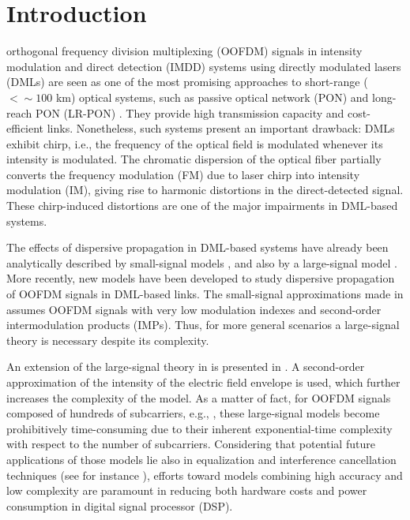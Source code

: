\documentclass[journal]{IEEEtran}
\begin{document}
\section{Introduction}
 orthogonal frequency division multiplexing (OOFDM) signals in intensity modulation and direct detection (IMDD) systems using directly modulated lasers (DMLs) are seen as one of the most promising approaches to short-range ($<\sim 100$ km) optical systems, such as passive optical network (PON) and long-reach PON (LR-PON) \cite{OFDM:promising, dsppon, equalization}. They provide high transmission capacity and cost-efficient links. Nonetheless, such systems present an important drawback: DMLs exhibit chirp, i.e., the frequency of the optical field is modulated whenever its intensity is modulated. The chromatic dispersion of the optical fiber partially converts the frequency modulation (FM) due to laser chirp into intensity modulation (IM), giving rise to harmonic distortions in the direct-detected signal. These chirp-induced distortions are one of the major impairments in DML-based systems. 

The effects of dispersive propagation in DML-based systems have already been analytically described by small-signal models \cite{smallsignal1, smallsignal2}, and also by a large-signal model \cite{eva,comments}. More recently, new models have been developed to study dispersive propagation of OOFDM signals in DML-based links. The small-signal approximations made in \cite{equalization} assumes OOFDM signals with very low modulation indexes and second-order intermodulation products (IMPs). Thus, for more general scenarios a large-signal theory is necessary despite its complexity. 

An extension of the large-signal theory in \cite{eva} is presented in \cite{evaOFDM}. A second-order approximation of the intensity of the electric field envelope is used, which further increases the complexity of the model. As a matter of fact, for OOFDM signals composed of hundreds of subcarriers, e.g., \cite{OFDM:promising, OFDM-GbE-UWB}, these large-signal models become prohibitively time-consuming due to their inherent exponential-time complexity with respect to the number of subcarriers. Considering that potential future applications of those models lie also in equalization and interference cancellation techniques (see for instance \cite{dsppon, equalization}), efforts toward models combining high accuracy and low complexity are paramount in reducing both hardware costs and power consumption in digital signal processor (DSP).
\end{document}
